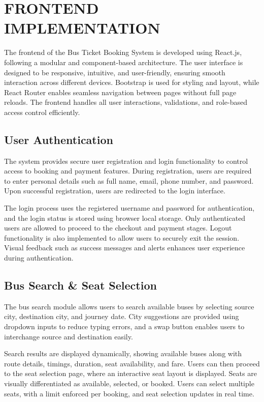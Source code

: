 \chapter{FRONTEND IMPLEMENTATION}

The frontend of the Bus Ticket Booking System is developed using React.js, following a modular and component-based architecture. The user interface is designed to be responsive, intuitive, and user-friendly, ensuring smooth interaction across different devices. Bootstrap is used for styling and layout, while React Router enables seamless navigation between pages without full page reloads. The frontend handles all user interactions, validations, and role-based access control efficiently.

\section{User Authentication}

The system provides secure user registration and login functionality to control access to booking and payment features. During registration, users are required to enter personal details such as full name, email, phone number, and password. Upon successful registration, users are redirected to the login interface.

The login process uses the registered username and password for authentication, and the login status is stored using browser local storage. Only authenticated users are allowed to proceed to the checkout and payment stages. Logout functionality is also implemented to allow users to securely exit the session. Visual feedback such as success messages and alerts enhances user experience during authentication.

\section{Bus Search \& Seat Selection}

The bus search module allows users to search available buses by selecting source city, destination city, and journey date. City suggestions are provided using dropdown inputs to reduce typing errors, and a swap button enables users to interchange source and destination easily. 

Search results are displayed dynamically, showing available buses along with route details, timings, duration, seat availability, and fare. Users can then proceed to the seat selection page, where an interactive seat layout is displayed. Seats are visually differentiated as available, selected, or booked. Users can select multiple seats, with a limit enforced per booking, and seat selection updates in real time.

